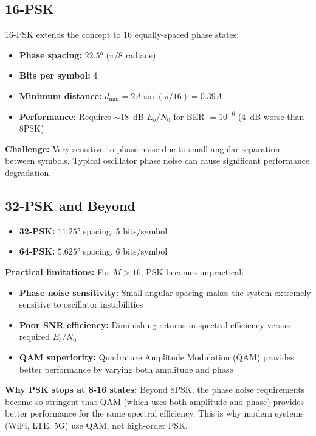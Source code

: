 \subsection{16-PSK}

16-PSK extends the concept to 16 equally-spaced phase states:

\begin{itemize}
\item \textbf{Phase spacing:} $22.5°$ ($\pi/8$ radians)
\item \textbf{Bits per symbol:} 4
\item \textbf{Minimum distance:} $d_{\min} = 2A\sin(\pi/16) = 0.39A$
\item \textbf{Performance:} Requires $\sim$18~dB $E_b/N_0$ for BER $= 10^{-6}$ (4~dB worse than 8PSK)
\end{itemize}

\textbf{Challenge:} Very sensitive to phase noise due to small angular separation between symbols. Typical oscillator phase noise can cause significant performance degradation.

\subsection{32-PSK and Beyond}

\begin{itemize}
\item \textbf{32-PSK:} $11.25°$ spacing, 5 bits/symbol
\item \textbf{64-PSK:} $5.625°$ spacing, 6 bits/symbol
\end{itemize}

\textbf{Practical limitations:} For $M > 16$, PSK becomes impractical:
\begin{itemize}
\item \textbf{Phase noise sensitivity:} Small angular spacing makes the system extremely sensitive to oscillator instabilities
\item \textbf{Poor SNR efficiency:} Diminishing returns in spectral efficiency versus required $E_b/N_0$
\item \textbf{QAM superiority:} Quadrature Amplitude Modulation (QAM) provides better performance by varying both amplitude and phase
\end{itemize}

\begin{warningbox}
\textbf{Why PSK stops at 8-16 states:} Beyond 8PSK, the phase noise requirements become so stringent that QAM (which uses both amplitude and phase) provides better performance for the same spectral efficiency. This is why modern systems (WiFi, LTE, 5G) use QAM, not high-order PSK.
\end{warningbox}

